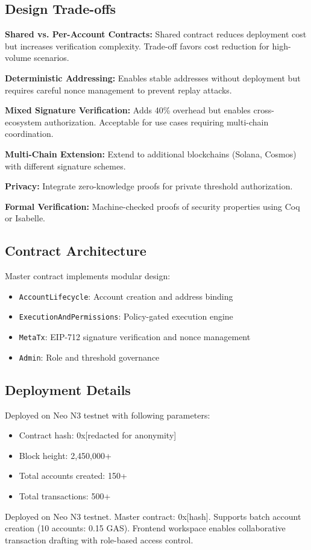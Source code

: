 \documentclass[10pt,twocolumn]{article}
\begin{document}
\subsection{Design Trade-offs}

\textbf{Shared vs. Per-Account Contracts:} Shared contract reduces deployment cost but increases verification complexity. Trade-off favors cost reduction for high-volume scenarios.

\textbf{Deterministic Addressing:} Enables stable addresses without deployment but requires careful nonce management to prevent replay attacks.

\textbf{Mixed Signature Verification:} Adds 40\% overhead but enables cross-ecosystem authorization. Acceptable for use cases requiring multi-chain coordination.


\textbf{Multi-Chain Extension:} Extend to additional blockchains (Solana, Cosmos) with different signature schemes.

\textbf{Privacy:} Integrate zero-knowledge proofs for private threshold authorization.

\textbf{Formal Verification:} Machine-checked proofs of security properties using Coq or Isabelle.


\subsection{Contract Architecture}

Master contract implements modular design:
\begin{itemize}[leftmargin=*,topsep=2pt,itemsep=1pt]
\item \texttt{AccountLifecycle}: Account creation and address binding
\item \texttt{ExecutionAndPermissions}: Policy-gated execution engine
\item \texttt{MetaTx}: EIP-712 signature verification and nonce management
\item \texttt{Admin}: Role and threshold governance
\end{itemize}

\subsection{Deployment Details}

Deployed on Neo N3 testnet with following parameters:
\begin{itemize}[leftmargin=*,topsep=2pt,itemsep=1pt]
\item Contract hash: 0x[redacted for anonymity]
\item Block height: 2,450,000+
\item Total accounts created: 150+
\item Total transactions: 500+
\end{itemize}


Deployed on Neo N3 testnet. Master contract: 0x[hash]. Supports batch account creation (10 accounts: 0.15 GAS). Frontend workspace enables collaborative transaction drafting with role-based access control.
\end{document}
